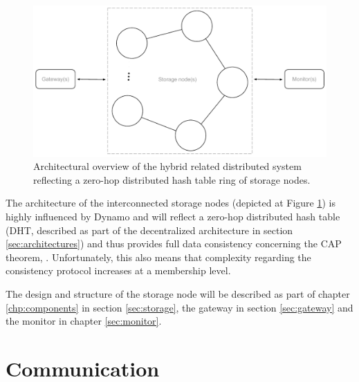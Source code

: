 \begin{figure}[h!]
	\centering
	\includegraphics[scale=0.7]{pdf/architecture-overview.pdf}
	\caption[Architectural overview]{Architectural overview of the hybrid related distributed system reflecting a zero-hop distributed hash table ring of storage nodes. \label{fig:architecture-overview}}
\end{figure}

The architecture of the interconnected storage nodes (depicted at Figure \ref{fig:architecture-overview}) is highly influenced by Dynamo and will reflect a zero-hop distributed hash table (DHT, described as part of the decentralized architecture in section \ref{sec:architectures}) and thus provides full data consistency concerning the CAP theorem, . Unfortunately, this also means that complexity regarding the consistency protocol increases at a membership level.
\newline

The design and structure of the storage node will be described as part of chapter \ref{chp:components} in section \ref{sec:storage}, the gateway in section \ref{sec:gateway} and the monitor in chapter \ref{sec:monitor}.

\section{Communication}


